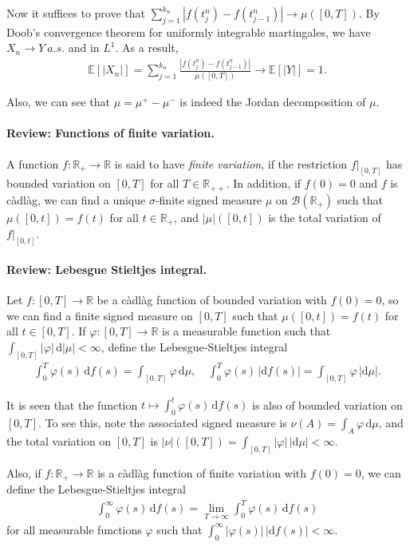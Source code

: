 \documentclass{article}
\numberwithin{equation}{section}
\newcommand{\E}{\mathbb{E}}
\renewcommand{\d}{\mathrm{d}}
\theoremstyle{plain}
\theoremstyle{definition}
\begin{document}
Now it suffices to prove that $\sum_{j=1}^{k_n}\left\vert f(t_j^n)-f(t_{j-1}^n)\right\vert\to \mu([0,T])$. By Doob's convergence theorem for uniformly integrable martingales, we have $X_n\to Y\ a.s.$ and in $L^1$. As a result,
\begin{align*}
	\E[\vert X_n\vert] = \sum_{j=1}^{k_n}\frac{\left\vert f(t_j^n)-f(t_{j-1}^n)\right\vert}{\mu([0,T])} \to \E[\vert Y\vert]=1.
\end{align*}

Also, we can see that $\mu=\mu^+-\mu^-$ is indeed the Jordan decomposition of $\mu$.

\paragraph{Review: Functions of finite variation.} A function $f:\mathbb{R}_+\to\mathbb{R}$ is said to have \textit{finite variation}, if the restriction $f|_{[0,T]}$ has bounded variation on $[0,T]$ for all $T\in\mathbb{R}_{++}$. In addition, if $f(0)=0$ and $f$ is càdlàg, we can find a unique $\sigma$-finite signed measure $\mu$ on $\mathscr{B}(\mathbb{R}_+)$ such that $\mu([0,t])=f(t)$ for all $t\in\mathbb{R}_+$, and $\vert\mu\vert([0,t])$ is the total variation of $f|_{[0,t]}$.

\paragraph{Review: Lebesgue Stieltjes integral.} Let $f:[0,T]\to\mathbb{R}$ be a càdlàg function of bounded variation with $f(0)=0$, so we can find a finite signed measure on $[0,T]$ such that $\mu([0,t])=f(t)$ for all $t\in[0,T]$. If $\varphi:[0,T]\to\mathbb{R}$ is a measurable function such that $\int_{[0,T]}\vert\varphi\vert\,\d \vert\mu\vert < \infty$, define the Lebesgue-Stieltjes integral
\begin{align*}
	\int_0^T \varphi(s)\,\d f(s) = \int_{[0,T]}\varphi\,\d\mu,\quad \int_0^T \varphi(s)\,\vert\d f(s)\vert = \int_{[0,T]}\varphi\,\vert\d\mu\vert.
\end{align*}

It is seen that the function $t\mapsto\int_0^t\varphi(s)\,\d f(s)$ is also of bounded variation on $[0,T]$. To see this, note the associated signed measure is $\nu(A)=\int_A\varphi\,\d \mu$, and the total variation on $[0,T]$ is $\vert\nu\vert([0,T])=\int_{[0,T]}\vert\varphi\vert\,\vert\d\mu\vert < \infty$.

Also, if $f:\mathbb{R}_+\to\mathbb{R}$ is a càdlàg function of finite variation with $f(0)=0$, we can define the Lebesgue-Stieltjes integral
\begin{align*}
	\int_0^\infty \varphi(s)\,\d f(s) = \lim_{T\to\infty}\int_0^T\varphi(s)\,\d f(s)
\end{align*}
for all measurable functions $\varphi$ such that $\int_0^\infty\vert\varphi(s)\vert\,\vert\d f(s)\vert < \infty$.
\end{document}
